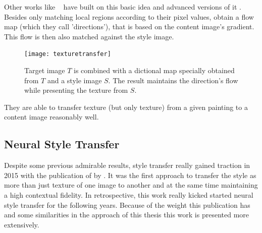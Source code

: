 Other works like \citeauthor*{texturetransfer}~\cite{texturetransfer} have built on this basic idea and advanced versions of it \cite{fasttexturetransfer} \cite{texturetransfer}.
Besides only matching local regions according to their pixel values, \citeauthor*{texturetransfer} obtain a flow map (which they call 'directions'), that is based on the content image's gradient.
This flow is then also matched against the style image.
\begin{figure}
    \texttt{[image: texturetransfer]}
    \caption[]{Target image $T$ is combined with a dictional map specially obtained from $T$ and a style image  $S$. The result maintains the direction's flow while presenting the texture from $S$.}
\end{figure}
They are able to transfer texture (but only texture) from a given painting to a content image reasonably well.





\subsection{Neural Style Transfer}
Despite some previous admirable results\cite{texturetransfer}, style transfer really gained traction in 2015 with the publication of  by \citeauthor*{gatys}.
It was the first approach to transfer the style as more than just texture of one image to another and at the same time maintaining a high contextual fidelity.
In retrospective, this work really kicked started neural style transfer for the following years.
Because of the weight this publication has and some similarities in the approach of this thesis this work is presented more extensively.


